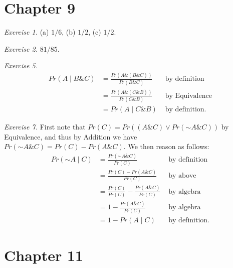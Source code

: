 \documentclass[justified]{tufte-book}
\newcommand{\given}{\mid}
\renewcommand{\neg}{\mathbin{\sim}}
\renewcommand{\wedge}{\mathbin{\&}}
\newcommand{\p}{Pr}
\theoremstyle{definition}
\theoremstyle{definition}
\theoremstyle{definition}
\theoremstyle{definition}
\theoremstyle{remark}
\begin{document}
\hypertarget{chapter-9}{%
\section*{Chapter 9}\label{chapter-9}}

\noindent
\emph{Exercise 1.} (a) \(1/6\), (b) \(1/2\), (c) \(1/2\).

\vspace{.5em}

\noindent
\emph{Exercise 2.} \(81/85\).

\vspace{.5em}

\noindent
\emph{Exercise 5.}
\[
  \begin{aligned}
    \p(A \given B \wedge C) 
      &= \frac{\p(A \wedge (B \wedge C))}{\p(B \wedge C)} & \text{ by definition}\\
      &= \frac{\p(A \wedge (C \wedge B))}{\p(C \wedge B)} & \text{ by Equivalence}\\
      &= \p(A \given C \wedge B)                          & \text{ by definition.}
  \end{aligned}
  \]

\vspace{.5em}

\noindent
\emph{Exercise 7.} First note that \(\p(C) = \p((A \wedge C) \vee \p(\neg A \wedge C))\) by Equivalence, and thus by Addition we have \(\p(\neg A \wedge C) = \p(C) - \p(A \wedge C)\). We then reason as follows:
\[
  \begin{aligned}
    \p(\neg A \given C) 
      &= \frac{\p(\neg A \wedge C)}{\p(C)}                  & \text{ by definition}\\
      &= \frac{\p(C) - \p(A \wedge C)}{\p(C)}               & \text{ by above}\\
      &= \frac{\p(C)}{\p(C)} - \frac{\p(A \wedge C)}{\p(C)} & \text{ by algebra}\\
      &= 1 - \frac{\p(A \wedge C)}{\p(C)}                   & \text{ by algebra}\\
      &= 1 - \p(A \given C)                                 & \text{ by definition.}
  \end{aligned}
  \]

\hypertarget{chapter-11}{%
\section*{Chapter 11}\label{chapter-11}}
\end{document}
